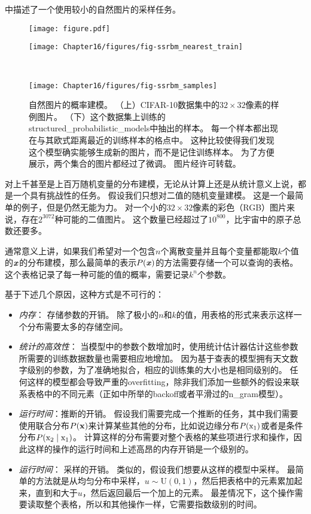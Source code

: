 中描述了一个使用较小的自然图片的采样任务。

\begin{figure}[!htb]
\ifOpenSource
\centerline{\texttt{[image: figure.pdf]}}
\else
	\centerline{\texttt{[image: Chapter16/figures/fig-ssrbm\_nearest\_train]}}\ \\
     \centerline{\texttt{[image: Chapter16/figures/fig-ssrbm\_samples]}}
\fi
	\caption{自然图片的概率建模。
（上）CIFAR-10数据集\citep{KrizhevskyHinton2009}中的$32\times 32$像素的样例图片。
（下）这个数据集上训练的\gls{structured_probabilistic_models}中抽出的样本。
每一个样本都出现在与其欧式距离最近的训练样本的格点中。
这种比较使得我们发现这个模型确实能够生成新的图片，而不是记住训练样本。
为了方便展示，两个集合的图片都经过了微调。
图片经\citet{Courville+al-2011-small}许可转载。}
	\label{fig:chap16_fig-ssrbm}
\end{figure}

对上千甚至是上百万随机变量的分布建模，无论从计算上还是从统计意义上说，都是一个具有挑战性的任务。
假设我们只想对二值的随机变量建模。
这是一个最简单的例子，但是仍然无能为力。
对一个小的$32\times 32$像素的彩色（RGB）图片来说，存在$2^{3072}$种可能的二值图片。
这个数量已经超过了$10^{800}$，比宇宙中的原子总数还要多。

通常意义上讲，如果我们希望对一个包含$n$个离散变量并且每个变量都能取$k$个值的$\boldsymbol{\mathit{x}}$的分布建模，那么最简单的表示$P(\boldsymbol{\mathit{x}})$的方法需要存储一个可以查询的表格。
这个表格记录了每一种可能的值的概率，需要记录$k^n$个参数。

基于下述几个原因，这种方式是不可行的：
\begin{itemize}
\item \emph{内存}： 存储参数的开销。
除了极小的$n$和$k$的值，用表格的形式来表示这样一个分布需要太多的存储空间。
	
\item  \emph{统计的高效性}： 当模型中的参数个数增加时，使用统计估计器估计这些参数所需要的训练数据数量也需要相应地增加。
因为基于查表的模型拥有天文数字级别的参数，为了准确地拟合，相应的训练集的大小也是相同级别的。
任何这样的模型都会导致严重的\gls{overfitting}，除非我们添加一些额外的假设来联系表格中的不同元素（正如中所举的\gls{backoff}或者平滑过的\gls{n_gram}模型）。
	
\item \emph{运行时间}：推断的开销。
假设我们需要完成一个推断的任务，其中我们需要使用联合分布$P(\mathbf{x})$来计算某些其他的分布，比如说边缘分布$P(\mathrm{x}_1)$或者是条件分布$P(\mathrm{x}_2\mid \mathrm{x}_1)$。
计算这样的分布需要对整个表格的某些项进行求和操作，因此这样的操作的运行时间和上述高昂的内存开销是一个级别的。
	
	
\item \emph{运行时间}： 采样的开销。
类似的，假设我们想要从这样的模型中采样。
最简单的方法就是从均匀分布中采样，$u\sim \text{U}(0,1)$，然后把表格中的元素累加起来，直到和大于$u$，然后返回最后一个加上的元素。
最差情况下，这个操作需要读取整个表格，所以和其他操作一样，它需要指数级别的时间。
\end{itemize}



